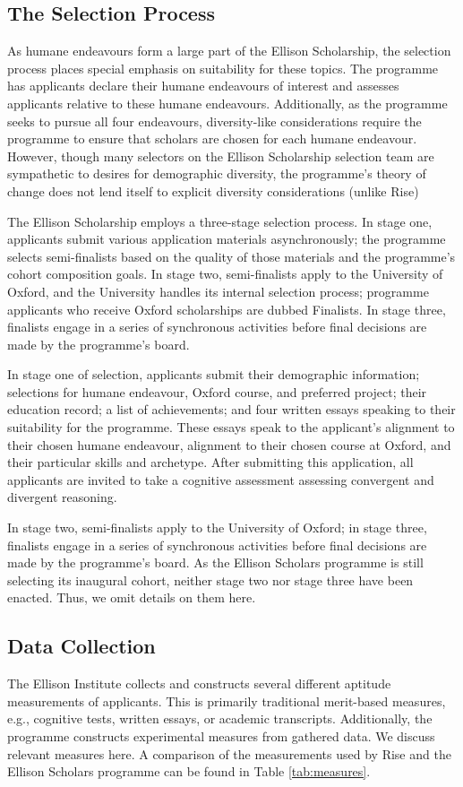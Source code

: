 \subsection{The Selection Process}
As humane endeavours form a large part of the Ellison Scholarship, the selection process places special emphasis on suitability for these topics. The programme has applicants declare their humane endeavours of interest and assesses applicants relative to these humane endeavours. Additionally, as the programme seeks to pursue all four endeavours, diversity-like considerations require the programme to ensure that scholars are chosen for each humane endeavour. However, though many selectors on the Ellison Scholarship selection team are sympathetic to desires for demographic diversity, the programme's theory of change does not lend itself to explicit diversity considerations (unlike Rise)

The Ellison Scholarship employs a three-stage selection process. In stage one, applicants submit various application materials asynchronously; the programme selects semi-finalists based on the quality of those materials and the programme's cohort composition goals. In stage two, semi-finalists apply to the University of Oxford, and the University handles its internal selection process; programme applicants who receive Oxford scholarships are dubbed Finalists. In stage three, finalists engage in a series of synchronous activities before final decisions are made by the programme's board. 

In stage one of selection, applicants submit their demographic information; selections for humane endeavour, Oxford course, and preferred project; their education record; a list of achievements; and four written essays speaking to their suitability for the programme. These essays speak to the applicant's alignment to their chosen humane endeavour, alignment to their chosen course at Oxford, and their particular skills and archetype. After submitting this application, all applicants are invited to take a cognitive assessment assessing convergent and divergent reasoning.

In stage two, semi-finalists apply to the University of Oxford; in stage three, finalists engage in a series of synchronous activities before final decisions are made by the programme's board. As the Ellison Scholars programme is still selecting its inaugural cohort, neither stage two nor stage three have been enacted. Thus, we omit details on them here. 

\subsection{Data Collection}
The Ellison Institute collects and constructs several different aptitude measurements of applicants. This is primarily traditional merit-based measures, e.g., cognitive tests, written essays, or academic transcripts. Additionally, the programme constructs experimental measures from gathered data. We discuss relevant measures here. A comparison of the measurements used by Rise and the Ellison Scholars programme can be found in Table \ref{tab:measures}.

